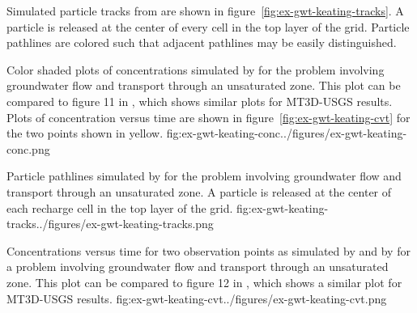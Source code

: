 Simulated particle tracks from \mf are shown in figure~\ref{fig:ex-gwt-keating-tracks}.  A particle is released at the center of every cell in the top layer of the grid.  Particle pathlines are colored such that adjacent pathlines may be easily distinguished.

\begin{StandardFigure}{
                                     Color shaded plots of concentrations simulated by \mf for the \cite{keating2009stable} problem involving groundwater flow and transport through an unsaturated zone.  This plot can be compared to figure 11 in \cite{mt3dusgs}, which shows similar plots for MT3D-USGS results.  Plots of concentration versus time are shown in figure~\ref{fig:ex-gwt-keating-cvt} for the two points shown in yellow.
                                     }{fig:ex-gwt-keating-conc}{../figures/ex-gwt-keating-conc.png}
\end{StandardFigure}                                  

\begin{StandardFigure}{
                                    Particle pathlines simulated by \mf for the \cite{keating2009stable} problem involving groundwater flow and transport through an unsaturated zone.  A particle is released at the center of each recharge cell in the top layer of the grid.
                                    }{fig:ex-gwt-keating-tracks}{../figures/ex-gwt-keating-tracks.png}
\end{StandardFigure}      

\begin{StandardFigure}{
                                     Concentrations versus time for two observation points as simulated by \mf and by \cite{keating2009stable} for a problem involving groundwater flow and transport through an unsaturated zone.  This plot can be compared to figure 12 in \cite{mt3dusgs}, which shows a similar plot for MT3D-USGS results.
                                     }{fig:ex-gwt-keating-cvt}{../figures/ex-gwt-keating-cvt.png}
\end{StandardFigure}                                  
